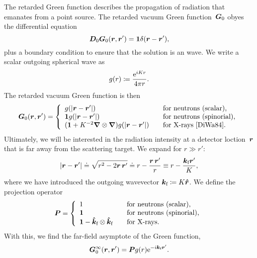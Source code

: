 The retarded Green function describes the propagation of radiation
that emanates from a point source.
The retarded vacuum Green function~$\bm{G}_0$ obyes the differential equation
\begin{equation}\label{EGoDGL}
  \TDo \TGo(\r,\r') = \v1 \delta(\r-\r'),
\end{equation}
plus a boundary condition to ensure that the solution is an  wave.
We write a scalar outgoing spherical wave as
\begin{equation}\label{Egr}
  g(r)
  \coloneqq \frac{\e^{iKr}}{4\pi r}.
\end{equation}
The retarded vacuum Green function is then
\begin{equation}\label{EGo}
  \TGo(\r,\r')
  = \left\{ \begin{array}{ll}
      g(|\r-\r'|)                                   &\text{~~~for neutrons (scalar),}\\
      \v1 g(|\r-\r'|)                               &\text{~~~for neutrons (spinorial),}\\
      (\v1 + K^{-2}\Nabla\otimes\Nabla) g(|\r-\r'|)  &\text{~~~for X-rays \cite{DiWa84}.}
  \end{array}\right.
\end{equation}
Ultimately, we will be interested in the radiation intensity
at a detector loction~$\bm{r}$ that is far away from the scattering target.
We expand for $r\gg r'$:
\begin{equation}\label{Effa}
  \left|\r-\r'\right|
  \doteq \sqrt{r^2-2\r\,\r'}
  \doteq r - \frac{\r\,\r'}{r}
  \equiv r - \frac{\k_\sf \r'}{K},
\end{equation}
%
where we have introduced the outgoing wavevector
$  {\bm{k}}_{\text{f}}\coloneqq K \bm{\hat r}$.
We define the projection operator
\begin{equation}\label{EdefP}
  \v{P}
  = \left\{ \begin{array}{ll}
      1                                        &\text{~~~for neutrons (scalar),}\\
      \v1                                      &\text{~~~for neutrons (spinorial),}\\
      \v1 - \v{\hat k}_\sf\otimes\v{\hat k}_\sf &\text{~~~for X-rays.}
  \end{array}\right.
\end{equation}
With this, we find the far-field asymptote of the Green function,
\begin{equation}\label{EGoInfty}
  \TGo^\infty(\r,\r')
  = \v{P}g(r)\e^{-i\k_\sf\r'}.
\end{equation}

